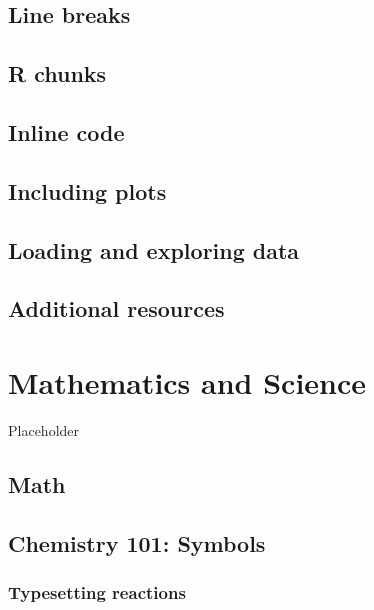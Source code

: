 \documentclass[12pt,twoside]{reedthesis}
\begin{document}
\hypertarget{line-breaks}{%
\section{Line breaks}\label{line-breaks}}

\hypertarget{r-chunks}{%
\section{R chunks}\label{r-chunks}}

\hypertarget{inline-code}{%
\section{Inline code}\label{inline-code}}

\hypertarget{including-plots}{%
\section{Including plots}\label{including-plots}}

\hypertarget{loading-and-exploring-data}{%
\section{Loading and exploring data}\label{loading-and-exploring-data}}

\hypertarget{additional-resources}{%
\section{Additional resources}\label{additional-resources}}

\hypertarget{math-sci}{%
\chapter{Mathematics and Science}\label{math-sci}}

Placeholder

\hypertarget{math}{%
\section{Math}\label{math}}

\hypertarget{chemistry-101-symbols}{%
\section{Chemistry 101: Symbols}\label{chemistry-101-symbols}}

\hypertarget{typesetting-reactions}{%
\subsection{Typesetting reactions}\label{typesetting-reactions}}
\end{document}

